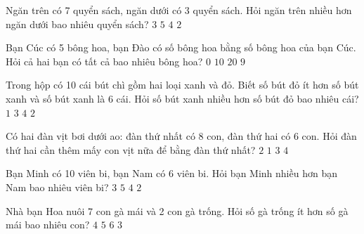 \begin{ex} %
Ngăn trên có 7 quyển sách, ngăn dưới có 3 quyển sách. Hỏi ngăn trên nhiều hơn ngăn dưới bao nhiêu quyển sách?
\choice
{$3$}
{$5$}
{\True $4$}
{$2$}
\end{ex}

\begin{ex} %
Bạn Cúc có 5 bông hoa, bạn Đào có số bông hoa bằng số bông hoa của bạn Cúc. Hỏi cả hai bạn có tất cả bao nhiêu bông hoa?
\choice
{$0$}
{\True $10$}
{$20$}
{$9$}
\end{ex}

\begin{ex} %
Trong hộp có 10 cái bút chì gồm hai loại xanh và đỏ. Biết số bút đỏ ít hơn số bút xanh và số bút xanh là 6 cái. Hỏi số bút xanh nhiều hơn số bút đỏ bao nhiêu cái?
\choice
{$1$}
{$3$}
{$4$}
{\True $2$}
\end{ex}

\begin{ex} %
Có hai đàn vịt bơi dưới ao: đàn thứ nhất có 8 con, đàn thứ hai có 6 con. Hỏi đàn thứ hai cần thêm mấy con vịt nữa để bằng đàn thứ nhất?
\choice
{\True $2$}
{$1$}
{$3$}
{$4$}
\end{ex}

\begin{ex} %
Bạn Minh có 10 viên bi, bạn Nam có 6 viên bi. Hỏi bạn Minh nhiều hơn bạn Nam bao nhiêu viên bi?
\choice
{$3$}
{$5$}
{\True $4$}
{$2$}
\end{ex}

\begin{ex} %
Nhà bạn Hoa nuôi 7 con gà mái và 2 con gà trống. Hỏi số gà trống ít hơn số gà mái bao nhiêu con?
\choice
{$4$}
{\True $5$}
{$6$}
{$3$}
\end{ex}


